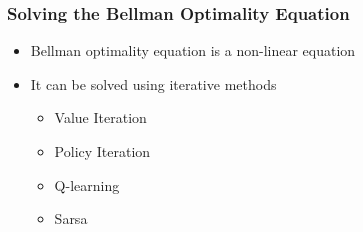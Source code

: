 \subsubsection*{Solving the Bellman Optimality Equation}
\begin{itemize}
    \item Bellman optimality equation is a non-linear equation
    \item It can be solved using iterative methods
    \begin{itemize}
        \item Value Iteration
        \item Policy Iteration
        \item Q-learning
        \item Sarsa
    \end{itemize}
\end{itemize}